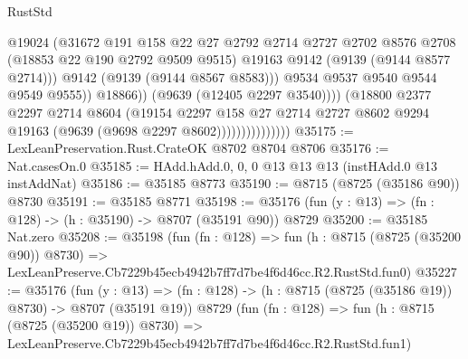\begin{lexlean}{RustStd}
\begin{coremodule}
                                        @19024
                                        (@31672
                                          @191
                                          @158
                                          @22
                                          @27
                                          @2792
                                          @2714
                                          @2727
                                          @2702
                                          @8576
                                          @2708
                                          (@18853 @22 @190 @2792 @9509 @9515)
                                          @19163
                                          @9142
                                          (@9139 (@9144 @8577 @2714)))
                                        @9142
                                        (@9139 (@9144 @8567 @8583)))
                                      @9534
                                      @9537
                                      @9540
                                      @9544
                                      @9549
                                      @9555))
                                  @18866))
                              (@9639 (@12405 @2297 @3540))))
                          (@18800
                            @2377
                            @2297
                            @2714
                            @8604
                            (@19154
                              @2297
                              @158
                              @27
                              @2714
                              @2727
                              @8602
                              @9294
                              @19163
                              (@9639 (@9698 @2297 @8602)))))))))))))))
@35175 := LexLeanPreservation.Rust.CrateOK @8702 @8704 @8706
@35176 := Nat.casesOn.{0}
@35185 := HAdd.hAdd.{0, 0, 0} @13 @13 @13 (instHAdd.{0} @13 instAddNat)
@35186 := @35185 @8773
@35190 := @8715 (@8725 (@35186 @90)) @8730
@35191 := @35185 @8771
@35198 := @35176 (fun (y : @13) => (fn : @128) -> (h : @35190) -> @8707 (@35191 @90)) @8729
@35200 := @35185 Nat.zero
@35208 := @35198
    (fun (fn : @128) =>
    fun (h : @8715 (@8725 (@35200 @90)) @8730) =>
    LexLeanPreserve.Cb7229b45ecb4942b7ff7d7be4f6d46cc.R2.RustStd.fun0)
@35227 := @35176
    (fun (y : @13) => (fn : @128) -> (h : @8715 (@8725 (@35186 @19)) @8730) -> @8707 (@35191 @19))
    @8729
    (fun (fn : @128) =>
    fun (h : @8715 (@8725 (@35200 @19)) @8730) =>
    LexLeanPreserve.Cb7229b45ecb4942b7ff7d7be4f6d46cc.R2.RustStd.fun1)

\end{coremodule}
\end{lexlean}
